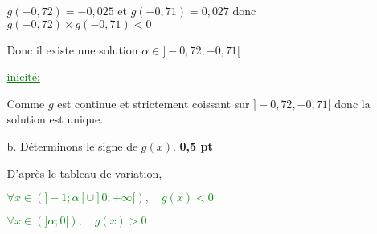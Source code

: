 \documentclass[12pt]{article}
\begin{document}
\begin{enumerate}
\begin{enumerate}
$g(-0,72)=-0,025$ et $g(-0,71)=0,027$ donc $g(-0,72)\times g(-0,71)<0$

Donc il existe une solution $\alpha \in ]-0,72, -0,71[$

\textcolor{green}{\underline{inicité:}}

Comme $g$ est continue et strictement coissant sur $]-0,72, -0,71[$ donc la solution est unique.

\item[b.] Déterminons le signe de $g(x)$. \textbf{0,5 pt}

D'après le tableau de variation, 

\textcolor{green}{$\forall x \in \left( ]-1;\alpha[\cup]0;+\infty[\right),\quad g(x)<0$}

\textcolor{green}{$\forall x \in \left( ]\alpha;0[\right),\quad g(x)>0$}
\end{enumerate}
\end{enumerate}
\end{document}
